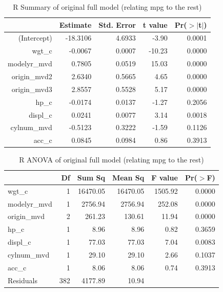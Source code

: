 \documentclass{article}
\begin{document}
\begin{table}[ht]
\centering
\begin{tabular}{rrrrr}
  \hline
 & Estimate & Std. Error & t value & Pr($>$$|$t$|$) \\ 
  \hline
(Intercept) & -18.3106 & 4.6933 & -3.90 & 0.0001 \\ 
  wgt\_c & -0.0067 & 0.0007 & -10.23 & 0.0000 \\ 
  modelyr\_mvd & 0.7805 & 0.0519 & 15.03 & 0.0000 \\ 
  origin\_mvd2 & 2.6340 & 0.5665 & 4.65 & 0.0000 \\ 
  origin\_mvd3 & 2.8557 & 0.5528 & 5.17 & 0.0000 \\ 
  hp\_c & -0.0174 & 0.0137 & -1.27 & 0.2056 \\ 
  displ\_c & 0.0241 & 0.0077 & 3.14 & 0.0018 \\ 
  cylnum\_mvd & -0.5123 & 0.3222 & -1.59 & 0.1126 \\ 
  acc\_c & 0.0845 & 0.0984 & 0.86 & 0.3913 \\ 
   \hline
\end{tabular}
\caption{R Summary of original full model (relating mpg to the rest)}
\label{tab:myfirsttable}
\end{table}


\begin{table}[ht]
\centering
\begin{tabular}{lrrrrr}
  \hline
 & Df & Sum Sq & Mean Sq & F value & Pr($>$F) \\ 
  \hline
wgt\_c & 1 & 16470.05 & 16470.05 & 1505.92 & 0.0000 \\ 
  modelyr\_mvd & 1 & 2756.94 & 2756.94 & 252.08 & 0.0000 \\ 
  origin\_mvd & 2 & 261.23 & 130.61 & 11.94 & 0.0000 \\ 
  hp\_c & 1 & 8.96 & 8.96 & 0.82 & 0.3659 \\ 
  displ\_c & 1 & 77.03 & 77.03 & 7.04 & 0.0083 \\ 
  cylnum\_mvd & 1 & 29.10 & 29.10 & 2.66 & 0.1037 \\ 
  acc\_c & 1 & 8.06 & 8.06 & 0.74 & 0.3913 \\ 
  Residuals & 382 & 4177.89 & 10.94 &  &  \\ 
   \hline
\end{tabular}
\caption{R ANOVA of original full model (relating mpg to the rest)}
\label{tab:myfirsttable}
\end{table}

\clearpage
\newpage 
\end{document}
